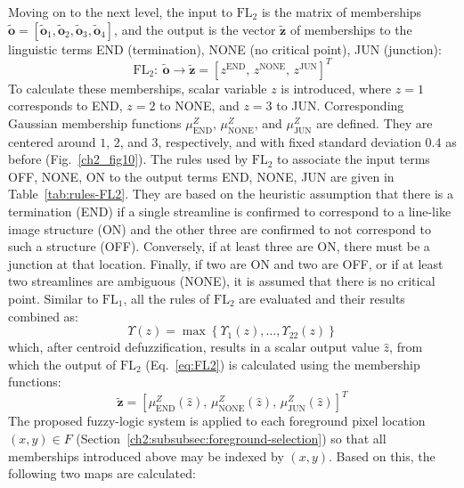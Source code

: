 Moving on to the next level, the input to $\mathrm{FL}_{2}$ is the matrix of memberships $\tilde{\mathbf{o}}=\left[\tilde{\mathbf{o}}_{1},\tilde{\mathbf{o}}_{2},\tilde{\mathbf{o}}_{3},\tilde{\mathbf{o}}_{4}\right]$, and the output is the vector $\tilde{\mathbf{z}}$ of memberships to the linguistic terms END (termination), NONE (no critical point), JUN (junction):
\begin{equation}
\mathrm{FL}_{2}\!:\ \tilde{\mathbf{o}} \rightarrow \tilde{\mathbf{z}} = \left[z^{\textrm{END}}\!,\, z^{\textrm{NONE}}\!,\, z^{\textrm{JUN}}\right]^T
\label{eq:FL2}
\end{equation}
To calculate these memberships, scalar variable $z$ is introduced, where $z=1$ corresponds to END, $z=2$ to NONE, and $z=3$ to JUN. Corresponding Gaussian membership functions $\mu_{\textrm{END}}^{Z}$, $\mu_{\textrm{NONE}}^{Z}$, and $\mu_{\textrm{JUN}}^{Z}$ are defined. They are centered around $1$, $2$, and $3$, respectively, and with fixed standard deviation $0.4$ as before (Fig.~\ref{ch2_fig10}). The rules used by $\mathrm{FL}_{2}$ to associate the input terms OFF, NONE, ON to the output terms END, NONE, JUN are given in Table~\ref{tab:rules-FL2}. They are based on the heuristic assumption that there is a termination (END) if a single streamline is confirmed to correspond to a line-like image structure (ON) and the other three are confirmed to not correspond to such a structure (OFF). Conversely, if at least three are ON, there must be a junction at that location. Finally, if two are ON and two are OFF, or if at least two streamlines are ambiguous (NONE), it is assumed that there is no critical point. Similar to $\mathrm{FL}_{1}$, all the rules of $\mathrm{FL}_{2}$ are evaluated and their results combined as:
\begin{equation}
\Upsilon(z) = \max\left\{\Upsilon_{1}(z),\dots,\Upsilon_{22}(z)\right\}
\end{equation}
which, after centroid defuzzification, results in a scalar output value $\hat{z}$, from which the output of $\mathrm{FL}_{2}$ (Eq.~\ref{eq:FL2}) is calculated using the membership functions:
\begin{equation}
\tilde{\mathbf{z}} = \left[\mu_{\textrm{END}}^{Z}(\hat{z}),\, \mu_{\textrm{NONE}}^{Z}(\hat{z}),\, \mu_{\textrm{JUN}}^{Z}(\hat{z})\right]^{T}
\end{equation}
The proposed fuzzy-logic system is applied to each foreground pixel location $(x,y)\in F$ (Section~\ref{ch2:subsubsec:foreground-selection}) so that all memberships introduced above may be indexed by $(x,y)$. Based on this, the following two maps are calculated:
